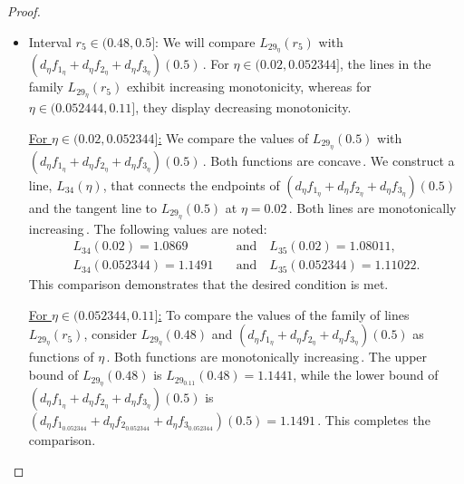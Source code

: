 \documentclass[final,11pt]{article}
\numberwithin{equation}{section}
\theoremstyle{definition}
\begin{document}
\begin{proof}
\begin{itemize}
\begin{itemize}
\begin{itemize}
In this way, $L_{32}(r_{5})>L_{33}(r_{5})$.

\item Interval $r_{5}\in(0.48,0.5]$: We will compare $L_{29_{\eta}}(r_{5})$ with $\left(d_{\eta}f_{1_{\eta}}+d_{ \eta}f_{2_{\eta}}+d_{\eta}f_{3_{\eta}}\right)(0.5)$\,. For $\eta\in(0.02,0.052344]$, the lines in the family $L_{29_{\eta}}(r_{5})$  exhibit increasing monotonicity, whereas for $\eta\in (0.052444,0.11]$, they display decreasing monotonicity.

\underline{For $\eta\in(0.02,0.052344]$:} We compare the values of $L_{29_{\eta}}(0.5)$ with $\left(d_{\eta}f_{1_{\eta}}+d_{\eta}f_{2_{\eta}}+d_{\eta}f_{3_{\eta}}\right)(0.5)$\,. Both functions are concave\,. We construct a line, $L_{34}(\eta)$, that connects the endpoints of $\left(d_{\eta}f_{1_{\eta}}+d_{\eta}f_{2_{\eta}}+d_{\eta}f_{3_{\eta}}\right)(0.5)$ and the tangent line to $L_{29_{\eta}}(0.5)$ at $\eta=0.02$\,. Both lines are monotonically increasing\,. The following values are noted:
\begin{equation*}
\begin{split}
L_{34}(0.02)=1.0869 \quad &\mbox{and} \quad L_{35}(0.02)=1.08011,\\
L_{34}(0.052344)=1.1491 \quad &\mbox{and} \quad L_{35}(0.052344)=1.11022.
\end{split}
\end{equation*}
This comparison demonstrates that the desired condition is met.

\underline{For $\eta\in(0.052344,0.11]$:} To compare the values of the family of lines \(L_{29_{\eta}}(r_{5})\), consider \(L_{29_{\eta}}(0.48)\) and \(\left(d_{\eta}f_{1_{\eta}}+d_{\eta}f_{2_{\eta}}+d_{\eta}f_{3_{\eta}}\right)(0.5)\) as functions of \(\eta\)\,. Both functions are monotonically increasing\,. The upper bound of \(L_{29_{\eta}}(0.48)\) is \(L_{29_{0.11}}(0.48)=1.1441\), while the lower bound of \(\left( d_{\eta}f_{1_{\eta}}+d_{\eta}f_{2_{\eta}}+d_{\eta}f_{3_{\eta}}\right)(0.5)\) is \(\left(d_{\eta}f_{1_{0.052344}}+d_{\eta}f_{2_{0.052344}}+d_{\eta}f_{3_{0.052344}}\right)(0.5)=1.1491\)\,.  This completes the comparison.


\end{itemize}
\end{itemize}
\end{itemize}
\end{proof}
\end{document}
